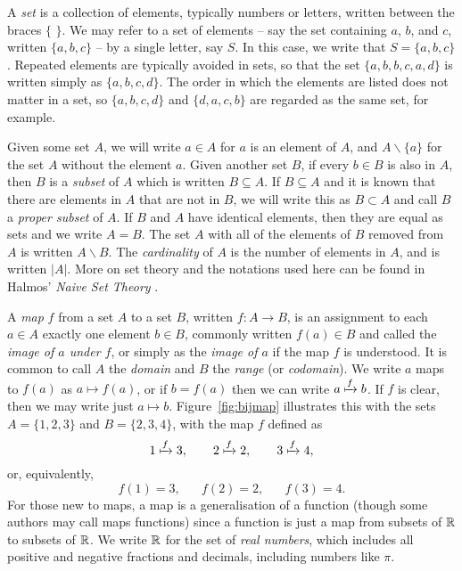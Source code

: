 A \textit{set} is a collection of elements, typically numbers or letters, written between the braces \(\{\,\,\}\). We may refer to a set of elements -- say the set containing \(a\), \(b\), and \(c\), written \(\{a, b, c\}\) -- by a single letter, say \(S\). In this case, we write that \(S = \{a, b, c\}\). Repeated elements are typically avoided in sets, so that the set \(\{a, b, b, c, a, d\}\) is written simply as \(\{a, b, c, d\}\). The order in which the elements are listed does not matter in a set, so \(\{a, b, c, d\}\) and \(\{d, a, c, b\}\) are regarded as the same set, for example.

Given some set \(A\), we will write \(a \in A\) for \(a\) is an element of \(A\), and \(A\backslash\{a\}\) for the set \(A\) without the element \(a\). Given another set \(B\), if every \(b \in B\) is also in \(A\), then \(B\) is a \textit{subset} of \(A\) which is written \(B \subseteq A\). If \(B \subseteq A\) and it is known that there are elements in \(A\) that are not in \(B\), we will write this as \(B \subset A\) and call \(B\) a \textit{proper subset} of \(A\). If \(B\) and \(A\) have identical elements, then they are equal as sets and we write \(A = B\). The set \(A\) with all of the elements of \(B\) removed from \(A\) is written \(A\backslash B\). The \textit{cardinality} of \(A\) is the number of elements in \(A\), and is written \(|A|\). More on set theory and the notations used here can be found in Halmos' \textit{Naive Set Theory} \cite{Halmos}.

A \textit{map} \(f\) from a set \(A\) to a set \(B\), written \(f \colon A \to B\), is an assignment to each \(a \in A\) exactly one element \(b \in B\), commonly written \(f(a) \in B\) and called the \textit{image of \(a\) under \(f\)}, or simply as the \textit{image of \(a\)} if the map \(f\) is understood. It is common to call \(A\) the \textit{domain} and \(B\) the \textit{range} (or \textit{codomain}). We write \(a\) maps to \(f(a)\) as \(a \mapsto f(a)\), or if \(b = f(a)\) then we can write \(a \xmapsto{f} b\). If \(f\) is clear, then we may write just \(a \mapsto b\). Figure~\ref{fig:bijmap} illustrates this with the sets \(A = \{1, 2, 3\}\) and \(B = \{2, 3, 4\}\), with the map \(f\) defined as
\[
1 \xmapsto{f} 3, \hspace{20pt} 2 \xmapsto{f} 2, \hspace{20pt} 3 \xmapsto{f} 4,
\]
or, equivalently,
\[
f(1) = 3, \hspace{20pt} f(2) = 2, \hspace{20pt} f(3) = 4.
\]
For those new to maps, a map is a generalisation of a function (though some authors may call maps functions) since a function is just a map from subsets of \(\mathbb{R}\) to subsets of \(\mathbb{R}\). We write \(\mathbb{R}\) for the set of \textit{real numbers}, which includes all positive and negative fractions and decimals, including numbers like \(\pi\).

